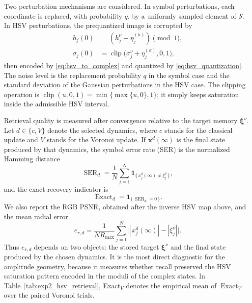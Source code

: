 \documentclass[10pt,journal,letterpaper]{IEEEtran}
\begin{document}
Two perturbation mechanisms are considered. In symbol perturbations, each
coordinate is replaced, with probability $q$, by a uniformly sampled element of
$\mathcal{S}$. In HSV perturbations, the prequantized image is corrupted by
\begin{align}
    h_j(0)
    &=
    (h_j^{\nu}+\eta_j^{(h)})\pmod{1},
    \\
    \sigma_j(0)
    &=
    \operatorname{clip}
    \bigl(\sigma_j^{\nu}+\eta_j^{(\sigma)},0,1\bigr),
\end{align}
then encoded by \eqref{eq:hsv_to_complex} and quantized by
\eqref{eq:hsv_quantization}. The noise level is the replacement probability
$q$ in the symbol case and the standard deviation of the Gaussian perturbations
in the HSV case. The clipping operation is
$\operatorname{clip}(u,0,1)=\min\{\max\{u,0\},1\}$; it simply keeps saturation
inside the admissible HSV interval.

Retrieval quality is measured after convergence relative to the target memory
$\boldsymbol{\xi}^{\nu}$. Let $d\in\{c,V\}$ denote the selected dynamics,
where $c$ stands for the classical update and $V$ stands for the Voronoi
update. If $\boldsymbol{x}^{d}(\infty)$ is the final state produced by that
dynamics, the symbol error rate (SER) is the normalized Hamming distance
\begin{equation}
    \operatorname{SER}_{d}
    =
    \frac{1}{N}\sum_{j=1}^{N}
    \mathbf{1}_{\{\,x_j^{d}(\infty)\neq \xi_j^{\nu}\,\}},
\end{equation}
and the exact-recovery indicator is
\begin{equation}
    \operatorname{Exact}_{d}
    =
    \mathbf{1}_{\{\,\operatorname{SER}_{d}=0\,\}}.
\end{equation}
We also report the RGB PSNR, obtained after the
inverse HSV map above, and the mean radial error
\begin{equation}
    e_{r,d}
    =
    \frac{1}{N R_{\max}}
    \sum_{j=1}^{N}\bigl||x_j^{d}(\infty)|-|\xi_j^{\nu}|\bigr|.
\end{equation}
Thus $e_{r,d}$ depends on two objects: the stored target
$\boldsymbol{\xi}^{\nu}$ and the final state produced by the chosen dynamics.
It is the most direct diagnostic for the amplitude geometry, because it
measures whether recall preserved the HSV saturation pattern encoded in the
moduli of the complex states. In Table~\ref{tab:exp2_hsv_retrieval}, Exact$_V$
denotes the empirical mean of $\operatorname{Exact}_{V}$ over the paired
Voronoi trials.
\end{document}
